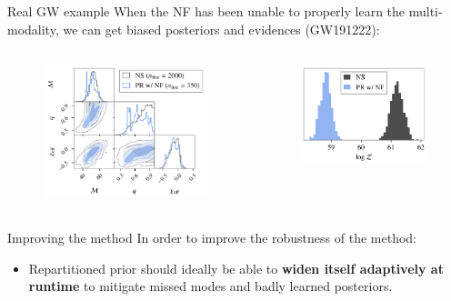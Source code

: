 \documentclass[aspectratio=169]{beamer}
\begin{document}
\begin{frame}{Real GW example}
    When the NF has been unable to properly learn the multi-modality, we can get biased posteriors and evidences (GW191222):
 
    \begin{columns}

\begin{figure}
    \centering
    \includegraphics[width=0.75\linewidth]{Ca_Foscari Beamer/presentation_GW191222_1.pdf}
\end{figure}

\begin{figure}
    \centering
    \includegraphics[width=0.75\linewidth]{Ca_Foscari Beamer/presentation_logZ_GW191222.pdf}
\end{figure}
\end{columns}
    
\end{frame}

\begin{frame}{Improving the method}
    In order to improve the robustness of the method: \vfill
    \begin{itemize}
        \item Repartitioned prior should ideally be able to \textbf{widen itself adaptively at runtime} to mitigate missed modes and badly learned posteriors.
    \end{itemize}
\end{frame}
\end{document}

